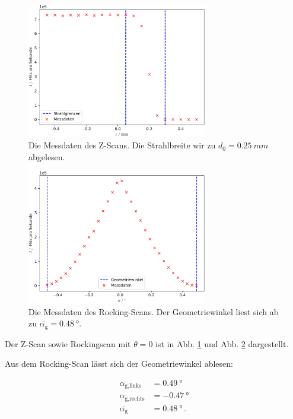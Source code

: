 \begin{figure}
    \centering
    \includegraphics[width=0.7\textwidth]{figures/zscan.pdf}
    \caption{Die Messdaten des Z-Scans. Die Strahlbreite wir zu $d_0=\SI{0.25}{mm}$ abgelesen.}
    \label{fig:zscanscan}
\end{figure}

\begin{figure}
    \centering
    \includegraphics[width=0.7\textwidth]{figures/rockingscan.pdf}
    \caption{Die Messdaten des Rocking-Scans. Der Geometriewinkel liest sich ab zu 
              $\overline{\alpha_\text{g}} = \SI{0.48}{\degree}$.}
    \label{fig:rockingscan}
\end{figure}
  \noindent
  \alpha
Der Z-Scan sowie Rockingscan mit $\theta = 0$ ist in Abb. \ref{fig:zscanscan} und Abb. \ref{fig:rockingscan}
dargestellt.

Aus dem Rocking-Scan lässt sich der Geometriewinkel ablesen:

\begin{align*}
  \alpha_\text{g,links} &= \SI{0.49}{\degree} \\
  \alpha_\text{g,rechts} &= \SI{-0.47}{\degree} \\
  \overline{\alpha_\text{g}} &= \SI{0.48}{\degree} \, .
\end{align*}

